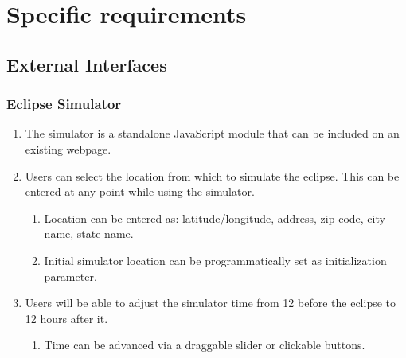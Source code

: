 \documentclass[10pt, onecolumn, draftclsnofoot, letterpaper, compsoc]{IEEEtran}
\begin{document}
\section{Specific requirements}

\subsection{External Interfaces}

\subsubsection{Eclipse Simulator}
	\begin{enumerate}
		\item The simulator is a standalone JavaScript module that can
		be included on an existing webpage.

		\item Users can select the location from which to simulate the eclipse. 
		This can be entered at any point while using the simulator.
		\begin{enumerate}
			\item Location can be entered as: latitude/longitude, address, zip code, 
			city name, state name.
			\item Initial simulator location can be programmatically set as 
			initialization parameter.
		\end{enumerate}

		\item Users will be able to adjust the simulator time from 12 before 
		the eclipse to 12 hours after it.
		\begin{enumerate}
			\item Time can be advanced via a draggable slider or clickable buttons.
		\end{enumerate}

	\end{enumerate}
\end{document}
